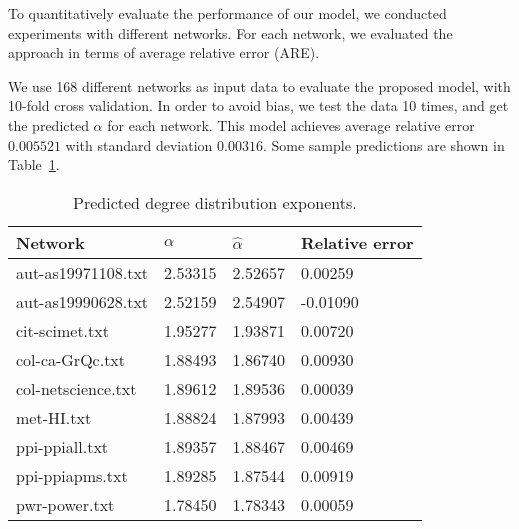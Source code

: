 
 To quantitatively evaluate the performance of our model, we conducted experiments with different networks.  For each network, we evaluated the approach in terms of average relative error (ARE).

 We use 168 different networks as input data to evaluate the proposed model, with 10-fold cross validation. In order to avoid bias, we test the data 10 times, and get the predicted $\alpha$ for each network.  This model achieves average relative error $0.005521$ with standard deviation $0.00316$.  Some sample predictions are shown in Table~\ref{table:alpha}.

%
%
%
%
%
\begin{table}[t]
\centering
\label{table:alpha}
\caption{Predicted degree distribution exponents.}
\begin{tabular}{|l|l|l|l|}
\hline
Network & $\alpha$ & $\hat{\alpha}$ & Relative error\\\hline
aut-as19971108.txt & 2.53315 & 2.52657 & 0.00259 \\\hline
aut-as19990628.txt & 2.52159 & 2.54907 & -0.01090 \\\hline
cit-scimet.txt & 1.95277 & 1.93871 & 0.00720 \\\hline
col-ca-GrQc.txt & 1.88493 & 1.86740 & 0.00930 \\\hline
col-netscience.txt & 1.89612 & 1.89536 & 0.00039 \\\hline
met-HI.txt & 1.88824 &  1.87993 & 0.00439 \\\hline
ppi-ppiall.txt & 1.89357 & 1.88467 & 0.00469 \\\hline
ppi-ppiapms.txt & 1.89285 & 1.87544 & 0.00919 \\\hline
pwr-power.txt & 1.78450 &  1.78343 & 0.00059 \\\hline
\end{tabular}
\end{table}
